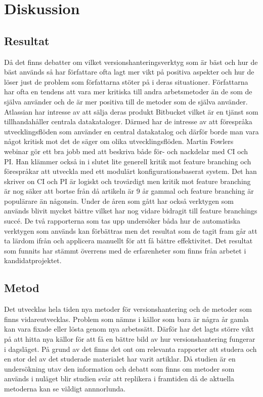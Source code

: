 \section{Diskussion}
\label{sec:bjorn-discussion}



\subsection{Resultat}
\label{subsec:bjorn-discussion-results}
Då det finns debatter om vilket versionshanteringsverktyg som är bäst och hur de bäst används så har författare ofta lagt mer vikt på positiva aspekter och hur de löser just de problem som författarna stöter på i deras situationer. Författarna har ofta en tendens att vara mer kritiska till andra arbetsmetoder än de som de själva använder och de är mer positiva till de metoder som de själva använder.
Atlassian har intresse av att sälja deras produkt Bitbucket vilket är en tjänst som tillhandahåller centrala datakataloger. Därmed har de intresse av att förespråka utvecklingsflöden som använder en central datakatalog och därför borde man vara något kritisk mot det de säger om olika utvecklingsflöden.
Martin Fowlers webinar gör ett bra jobb med att beskriva både för- och nackdelar med CI och PI. Han klämmer också in i slutet lite generell kritik mot feature branching och förespråkar att utveckla med ett modulärt konfigurationsbaserat system. Det han skriver on CI och PI är logiskt och trovärdigt men kritik mot feature branching är nog säker att bortse från då artikeln är 9 år gammal och feature branching är populärare än någonsin. Under de åren som gått har också verktygen som används blivit mycket bättre vilket har nog vidare bidragit till feature branchings succé.
De två rapporterna som tas upp undersöker båda hur de automatiska verktygen som används kan förbättras men det resultat som de tagit fram går att ta lärdom ifrån och applicera manuellt för att få bättre effektivitet.
Det resultat som funnits har stämmt överrens med de erfarenheter som finns från arbetet i kandidatprojektet.

\subsection{Metod}
\label{subsec:bjorn-discussion-method}
Det utvecklas hela tiden nya metoder för versionshantering och de metoder som finns vidareutvecklas. Problem som nämns i källor som bara är några år gamla kan vara fixade eller lösta genom nya arbetssätt. Därför har det lagts större vikt på att hitta nya källor för att få en bättre bild av hur versionshantering fungerar i dagsläget. På grund av det finns det ont om relevanta rapporter att studera och en stor del av det studerade materialet har varit artiklar.
Då studien är en undersökning utav den information och debatt som finns om metoder som används i nuläget blir studien svår att replikera i framtiden då de aktuella metoderna kan se väldigt annnorlunda.
